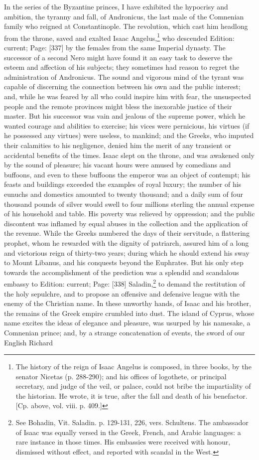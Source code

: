 In the series of the Byzantine princes, I have exhibited the hypocrisy and ambition, the tyranny and fall, of Andronicus, the last male of the Comnenian family who reigned at Constantinople. The revolution, which cast him headlong from the throne, saved and exalted Isaac Angelus,\footnote{The history of the reign of Isaac Angelus is composed, in three books, by the senator Nicetas (p. 288-290); and his offices of logothete, or principal secretary, and judge of the veil, or palace, could not bribe the impartiality of the historian. He wrote, it is true, after the fall and death of his benefactor. [Cp. above, vol. viii. p. 409.]} who descended Edition: current; Page: [337] by the females from the same Imperial dynasty. The successor of a second Nero might have found it an easy task to deserve the esteem and affection of his subjects; they sometimes had reason to regret the administration of Andronicus. The sound and vigorous mind of the tyrant was capable of discerning the connection between his own and the public interest; and, while he was feared by all who could inspire him with fear, the unsuspected people and the remote provinces might bless the inexorable justice of their master. But his successor was vain and jealous of the supreme power, which he wanted courage and abilities to exercise; his vices were pernicious, his virtues (if he possessed any virtues) were useless, to mankind; and the Greeks, who imputed their calamities to his negligence, denied him the merit of any transient or accidental benefits of the times. Isaac slept on the throne, and was awakened only by the sound of pleasure; his vacant hours were amused by comedians and buffoons, and even to these buffoons the emperor was an object of contempt; his feasts and buildings exceeded the examples of royal luxury; the number of his eunuchs and domestics amounted to twenty thousand; and a daily sum of four thousand pounds of silver would swell to four millions sterling the annual expense of his household and table. His poverty was relieved by oppression; and the public discontent was inflamed by equal abuses in the collection and the application of the revenue. While the Greeks numbered the days of their servitude, a flattering prophet, whom he rewarded with the dignity of patriarch, assured him of a long and victorious reign of thirty-two years; during which he should extend his sway to Mount Libanus, and his conquests beyond the Euphrates. But his only step towards the accomplishment of the prediction was a splendid and scandalous embassy to Edition: current; Page: [338] Saladin,\footnote{See Bohadin, Vit. Saladin. p. 129-131, 226, vers. Schultens. The ambassador of Isaac was equally versed in the Greek, French, and Arabic languages: a rare instance in those times. His embassies were received with honour, dismissed without effect, and reported with scandal in the West.} to demand the restitution of the holy sepulchre, and to propose an offensive and defensive league with the enemy of the Christian name. In these unworthy hands, of Isaac and his brother, the remains of the Greek empire crumbled into dust. The island of Cyprus, whose name excites the ideas of elegance and pleasure, was usurped by his namesake, a Comnenian prince; and, by a strange concatenation of events, the sword of our English Richard 